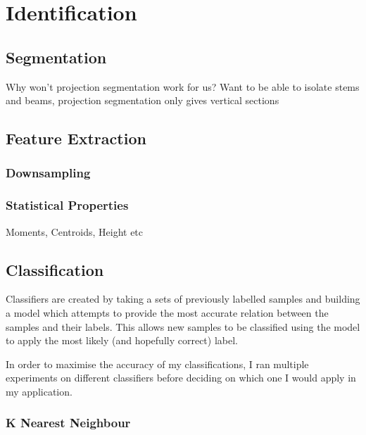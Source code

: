 \section{Identification}
\label{sec:identification}
\subsection{Segmentation}


Why won't projection segmentation work for us? Want to be able to isolate stems and beams, projection segmentation only gives vertical sections


\subsection{Feature Extraction}

\subsubsection{Downsampling}


\subsubsection{Statistical Properties}
\label{sec:statistical-properties}


Moments, Centroids, Height etc

\subsection{Classification}
\label{sec:implementation-classification}

Classifiers are created by taking a sets of previously labelled samples and building a model which attempts to provide the most accurate relation between the samples and their labels. This allows new samples to be classified using the model to apply the most likely (and hopefully correct) label.

In order to maximise the accuracy of my classifications, I ran multiple experiments on different classifiers before deciding on which one I would apply in my application.

\subsubsection{K Nearest Neighbour}

